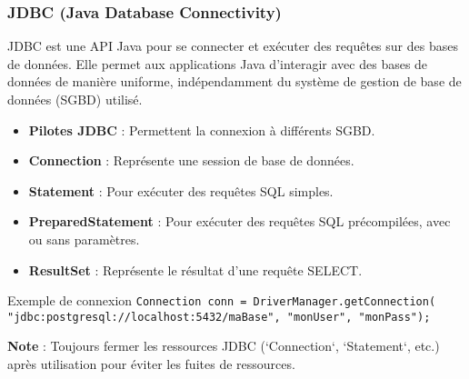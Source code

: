 \begin{frame}
  \frametitle{JDBC (Java Database Connectivity)}

  \small
  JDBC est une API Java pour se connecter et exécuter des requêtes sur des bases de données. Elle permet aux applications Java d'interagir avec des bases de données de manière uniforme, indépendamment du système de gestion de base de données (SGBD) utilisé.

  \begin{itemize}
    \item \textbf{Pilotes JDBC} : Permettent la connexion à différents SGBD.
    \item \textbf{Connection} : Représente une session de base de données.
    \item \textbf{Statement} : Pour exécuter des requêtes SQL simples.
    \item \textbf{PreparedStatement} : Pour exécuter des requêtes SQL précompilées, avec ou sans paramètres.
    \item \textbf{ResultSet} : Représente le résultat d'une requête SELECT.
  \end{itemize}

  \begin{exampleblock}{Exemple de connexion}
    \small
    \texttt{Connection conn = DriverManager.getConnection( \\
    \quad "jdbc:postgresql://localhost:5432/maBase", "monUser", "monPass");}
  \end{exampleblock}

  \small
  \textbf{Note} : Toujours fermer les ressources JDBC (`Connection`, `Statement`, etc.) après utilisation pour éviter les fuites de ressources.

\end{frame}

